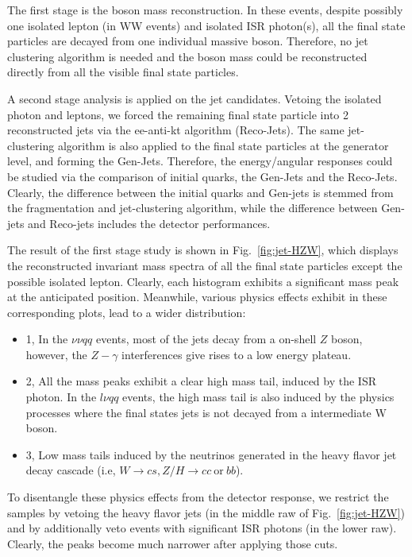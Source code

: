 The first stage is the boson mass reconstruction.
In these events, despite possibly one isolated lepton (in WW events) and isolated ISR photon(s),
all the final state particles are decayed from one individual massive boson.
Therefore, no jet clustering algorithm is needed and the boson mass could be reconstructed directly
from all the visible final state particles. 

A second stage analysis is applied on the jet candidates.
Vetoing the isolated photon and leptons,
we forced the remaining final state particle into 2 reconstructed jets via the ee-anti-kt algorithm (Reco-Jets).
The same jet-clustering algorithm is also applied to the final state particles at the generator level,
and forming the Gen-Jets.
Therefore, the energy/angular responses could be studied via the comparison of initial quarks,
the Gen-Jets and the Reco-Jets.
Clearly, the difference between the initial quarks and Gen-jets is stemmed from the fragmentation and jet-clustering algorithm,
while the difference between Gen-jets and Reco-jets includes the detector performances. 

The result of the first stage study is shown in Fig.~\ref{fig:jet-HZW},
which displays the reconstructed invariant mass spectra of all the final state particles except the possible isolated lepton.
Clearly, each histogram exhibits a significant mass peak at the anticipated position.
Meanwhile, various physics effects exhibit in these corresponding plots, lead to a wider distribution:

\begin{itemize}
\item[] 1, In the $\nu\nu qq$ events, most of the jets decay from a on-shell $Z$ boson, however,
  the $Z-\gamma$ interferences give rises to a low energy plateau. 

\item[] 2, All the mass peaks exhibit a clear high mass tail, induced by the ISR photon.
  In the $l\nu qq$ events, the high mass tail is also induced by the physics processes
  where the final states jets is not decayed from a intermediate W boson.

\item[] 3, Low mass tails induced by the neutrinos generated in the heavy flavor jet decay cascade
  (i.e, $W \to cs, Z/H \to cc~\mbox{or}~bb$). 
\end{itemize}

To disentangle these physics effects from the detector response,
we restrict the samples by vetoing the heavy flavor jets (in the middle raw of Fig.~\ref{fig:jet-HZW})
and by additionally veto events with significant ISR photons (in the lower raw).
Clearly, the peaks become much narrower after applying those cuts.


